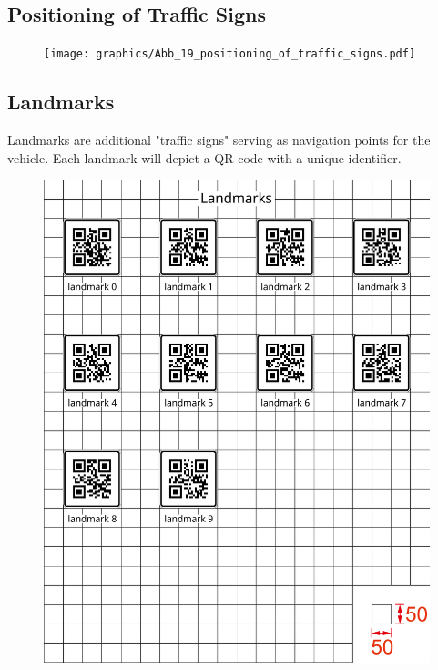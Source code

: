 \subsection{Positioning of Traffic Signs}
\begin{figure}[H]
	\begin{center}
		\centering\texttt{[image: graphics/Abb\_19\_positioning\_of\_traffic\_signs.pdf]}
	\end{center}
\end{figure}

\begin{highlight}[green]
\section{Landmarks}
\label{fig_landmarks}

Landmarks are additional "traffic signs" serving as navigation points for the
vehicle. Each landmark will depict a QR code with a unique identifier.

\begin{figure}[H]
	\begin{center}
		\centering\includegraphics[]{graphics/Abb_24_landmarks.pdf}
	\end{center}
\end{figure}
\end{highlight}

